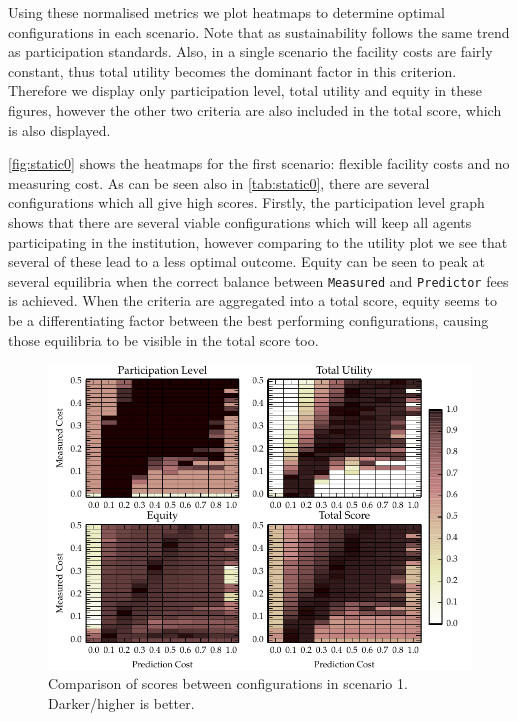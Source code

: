 Using these normalised metrics we plot heatmaps to determine optimal
configurations in each scenario. Note that as sustainability follows the same
trend as participation standards. Also, in a single scenario the facility
costs are fairly constant, thus total utility becomes the dominant factor in
this criterion. Therefore we display only participation level, total utility
and equity in these figures, however the other two criteria are also included
in the total score, which is also displayed.

\autoref{fig:static0} shows the heatmaps for the first scenario: flexible
facility costs and no measuring cost. As can be seen also in
\autoref{tab:static0}, there are several configurations which all give high
scores. Firstly, the participation level graph shows that there are several
viable configurations which will keep all agents participating in the
institution, however comparing to the utility plot we see that several of
these lead to a less optimal outcome. Equity can be seen to peak at several
equilibria when the correct balance between \texttt{Measured} and
\texttt{Predictor} fees is achieved. When the criteria are aggregated into a
total score, equity seems to be a differentiating factor between the best
performing configurations, causing those equilibria to be visible in the total
score too.

\begin{figure}
\includegraphics{gfx/kc/static_0.pdf} 
\caption[Comparison of scores between configurations in scenario 1.]{Comparison of scores between configurations in scenario 1. Darker/higher is better.}\label{fig:static0}
\end{figure}

